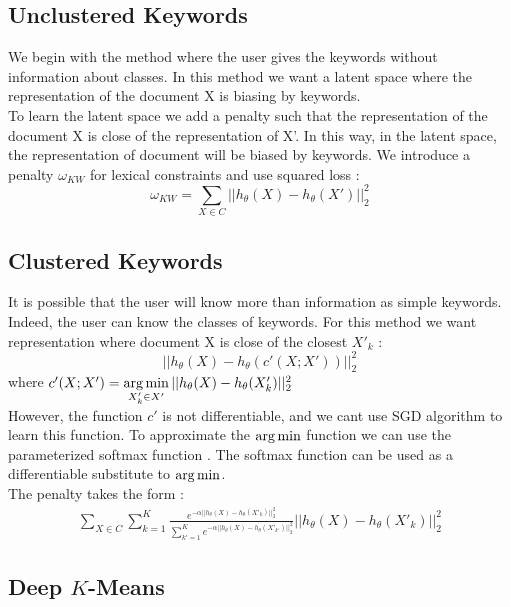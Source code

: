 \subsection{Unclustered Keywords}
We begin with the method where the user gives the keywords without information
about classes. In this method we want a latent space where the representation
of the document X is biasing by keywords.\\
To learn the latent space we add a penalty such that the representation
of the document X is close of the representation of X'. In this way, in the
latent space, the representation of document will be biased by keywords.
We introduce a penalty $\omega_{KW}$ for lexical constraints and
use squared loss : 
\begin{equation}\label{eq:omega1}
  \omega_{KW} = \sum\limits_{X \in C} || h_\theta(X) - h_\theta(X')||_2^2
\end{equation}
\subsection{Clustered Keywords}
It is possible that the user will know more than
information as simple keywords. Indeed, the user can know the 
classes of keywords. 
For this method we want representation where document X is close of the closest
$X'_k$ : 
\begin{equation}
|| h_\theta(X) - h_\theta(c'(X ; X' )) ||_2^2
\end{equation}
where $c'(X ; X') = \operatorname*{arg\,min}\limits_{X'_k \in X'} ||h_\theta(X) - h_\theta(X'_k) ||_2^2$\\ 
However, the  function $c'$ is not differentiable, and we cant use SGD algorithm
\cite{doi:10.1080/01621459.1982.10477894}
to learn this function. To approximate the $\operatorname*{arg\,min}$ function we can use the 
parameterized softmax function \cite{doi:10.1117/1.2819119}. The softmax 
function can be used as a differentiable substitute to $\operatorname*{arg\,min}$. 
\\The penalty takes the form : 
\begin{equation}\label{eq:omega_kw_soft}
\begin{array}{l}
  \sum\limits_{X \in C} \sum\limits_{k = 1}^K \frac{e^{-\alpha|| h_\theta(X) - 
h_\theta(X'_k)||_2^2}}{\sum\limits_{k' = 1}^K e^{-\alpha|| h_\theta(X) - 
h_\theta(X'_{k'})||_2^2}}|| h_\theta(X) - h_\theta(X'_{k})||_2^2
\end{array}
\end{equation}

\subsection{Deep $K$-Means}

